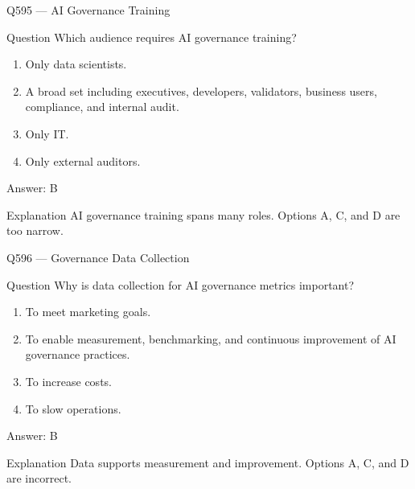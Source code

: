 \documentclass[aspectratio=169,8pt]{beamer}
\begin{document}
	\begin{frame}{Q595 --- AI Governance Training}
		\begin{block}{Question}
			Which audience requires AI governance training?
			\begin{enumerate}
				\item Only data scientists.
				\item A broad set including executives, developers, validators, business users, compliance, and internal audit.
				\item Only IT.
				\item Only external auditors.
			\end{enumerate}
		\end{block}
		\begin{exampleblock}{Answer: B}\end{exampleblock}
		\begin{block}{Explanation}
			AI governance training spans many roles. Options A, C, and D are too narrow.
		\end{block}
	\end{frame}
	
	\begin{frame}{Q596 --- Governance Data Collection}
		\begin{block}{Question}
			Why is data collection for AI governance metrics important?
			\begin{enumerate}
				\item To meet marketing goals.
				\item To enable measurement, benchmarking, and continuous improvement of AI governance practices.
				\item To increase costs.
				\item To slow operations.
			\end{enumerate}
		\end{block}
		\begin{exampleblock}{Answer: B}\end{exampleblock}
		\begin{block}{Explanation}
			Data supports measurement and improvement. Options A, C, and D are incorrect.
		\end{block}
	\end{frame}
	
\end{document}
